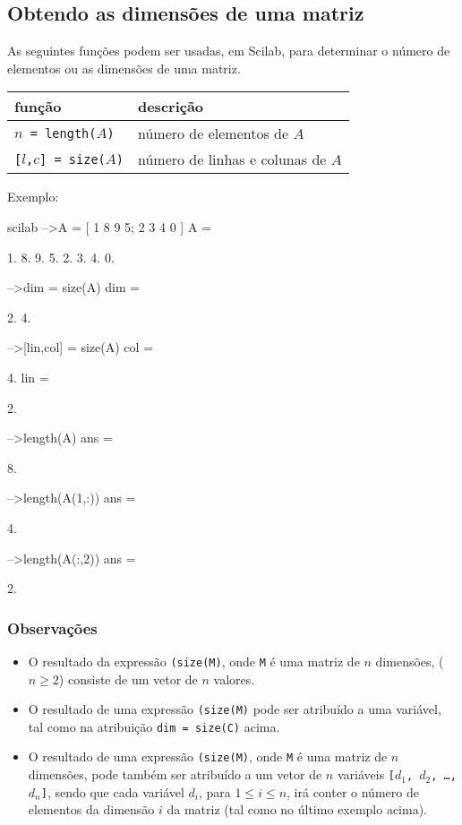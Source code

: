 \documentclass[11pt]{practice}
\begin{document}
\subsection{Obtendo as dimensões de uma matriz}

As seguintes funções podem ser usadas, em Scilab, para determinar o
número de elementos ou as dimensões de uma matriz.

\begin{center}
  \begin{tabular}{lp{8cm}} \hline
    \textbf{função}                & \textbf{descrição}                \\\hline
    \texttt{$n$ = length($A$)}     & número de elementos de $A$        \\\hline
    \texttt{[$l$,$c$] = size($A$)} & número de linhas e colunas de $A$ \\\hline
  \end{tabular}
\end{center}

Exemplo:
\begin{lst}{scilab}
-->A = [ 1 8 9 5; 2 3 4 0 ]
 A  =
 
    1.    8.    9.    5.  
    2.    3.    4.    0.  

-->dim = size(A)
 dim  =
 
      2.    4.  
 
-->[lin,col] = size(A)
 col  =
 
    4.  
 lin  =
 
    2.  

-->length(A)
 ans  =

     8.

-->length(A(1,:))
 ans  =
 
      4.

-->length(A(:,2))
ans  =
 
      2.
\end{lst}

\subsubsection*{Observações}
\begin{itemize}
  \item O resultado da expressão \texttt{(size(M)}, onde \texttt{M} é
  uma matriz de $n$ dimensões, ($n\geq 2$) consiste de um vetor de $n$
  valores.
  \item O resultado de uma expressão \texttt{(size(M)} pode ser
  atribuído a uma variável, tal como na atribuição \texttt{dim =
    size(C)} acima.
  \item O resultado de uma expressão \texttt{(size(M)}, onde \texttt{M}
  é uma matriz de $n$ dimensões, pode também ser atribuído a um vetor de
  $n$ variáveis \texttt{[$d_1$, $d_2$, \ldots, $d_n$]}, sendo que cada
  variável $d_i$, para $1 \leq i \leq n$, irá conter o número de
  elementos da dimensão $i$ da matriz (tal como no último exemplo
  acima).
\end{itemize}
\end{document}
